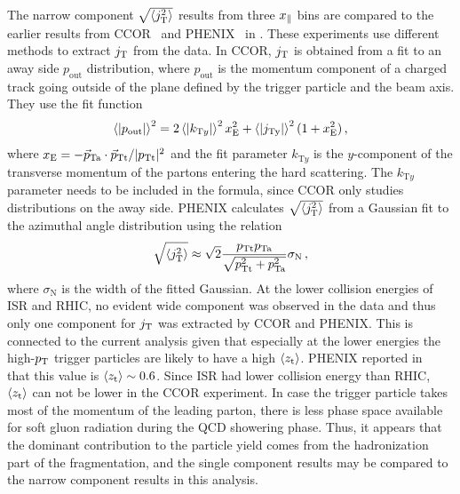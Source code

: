 The narrow component $\sqrt{\left<j_{\rm T}^2\right>}$ results from three $x_{\parallel}$ bins are compared to the earlier results from CCOR~\cite{firstjtmeasurement} and PHENIX~\cite{PHENIXjets} in . These experiments use different methods to extract $j_{\rm T}$ from the data. In CCOR, $j_{\rm T}$ is obtained from a fit to an away side $p_{\mathrm{out}}$ distribution, where $p_{\mathrm{out}}$ is the momentum component of a charged track going outside of the plane defined by the trigger particle and the beam axis. They use the fit function
\begin{equation}
\mean{|p_{\mathrm{out}}|}^{2} = 2 \mean{|k_{\mathrm{T}y}|}^{2} x_{\mathrm{E}}^{2} + \mean{|\jt{y}|}^{2}(1+x_{\mathrm{E}}^{2}) \,,
\label{eq:ccorjt}
\end{equation}
where $x_{\mathrm{E}} = -\vec{p}_{\mathrm{Ta}} \cdot \vec{p}_{\mathrm{Tt}} / |p_{\rm Tt}|^2$ and the fit parameter $k_{\mathrm{T}y}$ is the $y$-component of the transverse momentum of the partons entering the hard scattering. The $k_{\mathrm{T}y}$ parameter needs to be included in the formula, since CCOR only studies distributions on the away side. PHENIX calculates $\sqrt{\left<j_{\rm T}^2\right>}$ from a Gaussian fit to the azimuthal angle distribution using the relation
\begin{equation}
\sqrt{\left<j_{\rm T}^2\right>} \approx \sqrt{2} \frac{p_{\rm Tt} p_{\rm Ta}}{\sqrt{p_{\rm Tt}^2 + p_{\rm Ta}^2}} \sigma_{\mathrm{N}} \,,
\label{eq:phenixjt}
\end{equation}
where $\sigma_{\mathrm{N}}$ is the width of the fitted Gaussian. At the lower collision energies of ISR and RHIC, no evident wide component was observed in the data and thus only one component for $j_{\rm T}$ was extracted by CCOR and PHENIX. This is connected to the current analysis given that especially at the lower energies the high-$p_{\rm T}$ trigger particles are likely to have a high $\left<z_{\mathrm{t}}\right>$. PHENIX reported in~\cite{PHENIXjets} that this value is $\left<z_{\mathrm{t}}\right> \sim 0.6$. Since ISR had lower collision energy than RHIC, $\left<z_{\mathrm{t}}\right>$ can not be lower in the CCOR experiment. In case the trigger particle takes most of the momentum of the leading parton, there is less phase space available for soft gluon radiation during the QCD showering phase. Thus, it appears that the dominant contribution to the particle yield comes from the hadronization part of the fragmentation, and the single component results may be compared to the narrow component results in this analysis.

